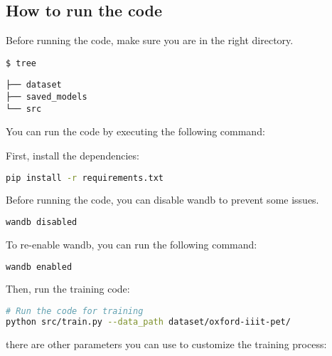 
\subsection{How to run the code}

Before running the code, make sure you are in the right directory.

\lstinline|$ tree|

\begin{verbatim}
├── dataset
├── saved_models
└── src
\end{verbatim}

You can run the code by executing the following command:

First, install the dependencies:

\begin{lstlisting}[language=bash, caption=Install the dependencies, label=lst:install_dependencies]
pip install -r requirements.txt
\end{lstlisting}

Before running the code, you can disable wandb to prevent some issues.

\begin{lstlisting}[language=bash, caption=Disable wandb, label=lst:disable_wandb]
wandb disabled
\end{lstlisting}

To re-enable wandb, you can run the following command:

\begin{lstlisting}[language=bash, caption=Enable wandb, label=lst:enable_wandb]
wandb enabled
\end{lstlisting}

Then, run the training code:

\begin{lstlisting}[language=bash, caption=How to run the training code, label=lst:run_train_code]
# Run the code for training
python src/train.py --data_path dataset/oxford-iiit-pet/
\end{lstlisting}

there are other parameters you can use to customize the training process:

